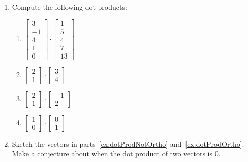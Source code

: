 \documentclass[12pt]{amsart}
\theoremstyle{definition}
\begin{document}
\begin{enumerate}[itemsep=0.8em,leftmargin=0pt]
\newpage

\item Compute the following dot products:
\begin{enumerate}[itemsep=0.5em]
    \item $\displaystyle \begin{bmatrix}3\\-1\\4\\1\\0\end{bmatrix} \cdot \begin{bmatrix}1\\5\\4\\7\\13\end{bmatrix}=$
    \item\label{ex:dotProdNotOrtho} $\displaystyle \begin{bmatrix}2\\1\end{bmatrix} \cdot \begin{bmatrix}3\\4 \end{bmatrix}=$
    \item\label{ex:dotProdOrtho} $\displaystyle \begin{bmatrix}2\\1\end{bmatrix} \cdot \begin{bmatrix}-1\\2 \end{bmatrix}=$
    \item $\displaystyle \begin{bmatrix}1\\0\end{bmatrix} \cdot \begin{bmatrix}0\\1 \end{bmatrix}=$
\end{enumerate}


\item Sketch the vectors in parts~\ref{ex:dotProdNotOrtho} and~\ref{ex:dotProdOrtho}. Make a conjecture about when the dot product of two vectors is $0$.

\vspace{.8em}


\end{enumerate}
\end{document}

